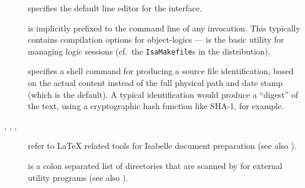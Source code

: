 \begin{isabellebody}
\begin{isamarkuptext}
\begin{description}
  \item[\hypertarget{setting.ISABELLE-LINE-EDITOR}{\hyperlink{setting.ISABELLE-LINE-EDITOR}{\mbox{}}}] specifies the default
  line editor for the \hyperlink{tool.tty}{\mbox{}} interface.

  \item[\hypertarget{setting.ISABELLE-USEDIR-OPTIONS}{\hyperlink{setting.ISABELLE-USEDIR-OPTIONS}{\mbox{}}}] is implicitly prefixed
  to the command line of any \hyperlink{tool.usedir}{\mbox{}} invocation. This
  typically contains compilation options for object-logics --- \hyperlink{tool.usedir}{\mbox{}} is the basic utility for managing logic sessions (cf.\ the
  \verb|IsaMakefile|s in the distribution).

  \item[\hypertarget{setting.ISABELLE-FILE-IDENT}{\hyperlink{setting.ISABELLE-FILE-IDENT}{\mbox{}}}] specifies a shell command
  for producing a source file identification, based on the actual
  content instead of the full physical path and date stamp (which is
  the default). A typical identification would produce a ``digest'' of
  the text, using a cryptographic hash function like SHA-1, for
  example.
  
  \item[\hypertarget{setting.ISABELLE-LATEX}{\hyperlink{setting.ISABELLE-LATEX}{\mbox{}}}, \hypertarget{setting.ISABELLE-PDFLATEX}{\hyperlink{setting.ISABELLE-PDFLATEX}{\mbox{}}}, \hypertarget{setting.ISABELLE-BIBTEX}{\hyperlink{setting.ISABELLE-BIBTEX}{\mbox{}}}, \hypertarget{setting.ISABELLE-DVIPS}{\hyperlink{setting.ISABELLE-DVIPS}{\mbox{}}}] refer to {\LaTeX} related tools for Isabelle
  document preparation (see also ).
  
  \item[\hypertarget{setting.ISABELLE-TOOLS}{\hyperlink{setting.ISABELLE-TOOLS}{\mbox{}}}] is a colon separated list of
  directories that are scanned by \hyperlink{executable.isabelle}{\mbox{}} for external
  utility programs (see also ).
  

\end{description}
\end{isamarkuptext}
\end{isabellebody}
